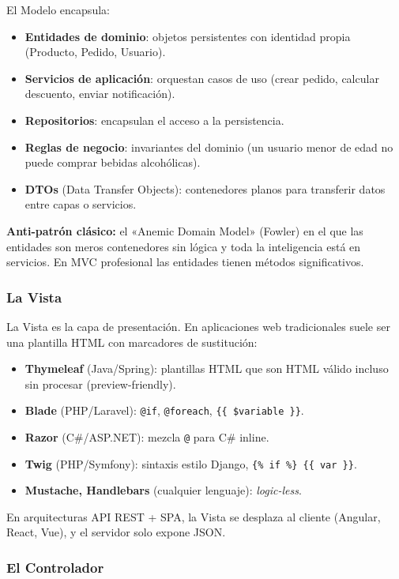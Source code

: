 El Modelo encapsula:
\begin{itemize}
\item \textbf{Entidades de dominio}: objetos persistentes con
identidad propia (Producto, Pedido, Usuario).
\item \textbf{Servicios de aplicación}: orquestan casos de uso
(crear pedido, calcular descuento, enviar notificación).
\item \textbf{Repositorios}: encapsulan el acceso a la persistencia.
\item \textbf{Reglas de negocio}: invariantes del dominio
(un usuario menor de edad no puede comprar bebidas alcohólicas).
\item \textbf{DTOs} (Data Transfer Objects): contenedores planos
para transferir datos entre capas o servicios.
\end{itemize}

\textbf{Anti-patrón clásico:} el «Anemic Domain Model» (Fowler) en
el que las entidades son meros contenedores sin lógica y toda la
inteligencia está en servicios. En MVC profesional las entidades
tienen métodos significativos.

\subsubsection{La Vista}

La Vista es la capa de presentación. En aplicaciones web tradicionales
suele ser una plantilla HTML con marcadores de sustitución:

\begin{itemize}
\item \textbf{Thymeleaf} (Java/Spring): plantillas HTML que son HTML
válido incluso sin procesar (preview-friendly).
\item \textbf{Blade} (PHP/Laravel): \texttt{@if}, \texttt{@foreach},
\texttt{\{\{ \$variable \}\}}.
\item \textbf{Razor} (C\#/ASP.NET): mezcla \texttt{@} para C\# inline.
\item \textbf{Twig} (PHP/Symfony): sintaxis estilo Django,
\texttt{\{\% if \%\} \{\{ var \}\}}.
\item \textbf{Mustache, Handlebars} (cualquier lenguaje): \emph{logic-less}.
\end{itemize}

En arquitecturas API REST + SPA, la Vista se desplaza al cliente
(Angular, React, Vue), y el servidor solo expone JSON.

\subsubsection{El Controlador}

